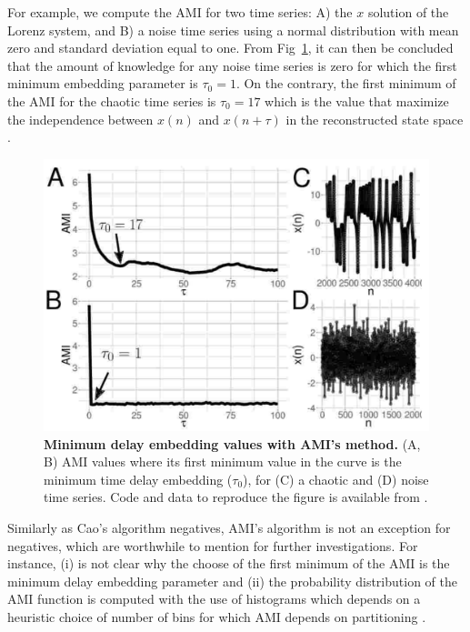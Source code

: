 \documentclass[fleqn,10pt]{wlscirep}
\begin{document}
For example, we compute the AMI for two time series:
A) the $x$ solution of the Lorenz system, and
B) a noise time series using a normal distribution with mean zero and 
standard deviation equal to one. From Fig~\ref{fig:amis}, it can then be 
concluded that the amount of knowledge for any noise time series is zero 
for which the first minimum embedding parameter is $\tau_0=1$. 
On the contrary, the first minimum of the AMI for the chaotic time series 
is $\tau_0=17$ which is the value that maximize the independence 
between $x(n)$ and $x(n+\tau)$ in the reconstructed state space 
\cite{bradley2015}.
\begin{figure}[ht]
\centering
\includegraphics[width=1.0\textwidth]{figures/methods/ami/pdf/ami}
    \caption{
	{\bf Minimum delay embedding values with AMI's method.} 
    	(A, B) AMI values where its first minimum value in the curve
	is the minimum time delay embedding ($\tau_0$), 
	for (C) a chaotic and (D) noise time series.
	Code and data to reproduce the figure is available from \cite{srep2019}.
        }
    \label{fig:amis}
\end{figure}
Similarly as Cao's algorithm negatives, AMI's algorithm is not an
exception for negatives, which are worthwhile to mention for further 
investigations.
For instance, (i) is not clear why the choose of the first minimum of the AMI 
is the minimum delay embedding parameter \cite{kantz2003} and 
(ii) the probability distribution of the AMI function is computed
with the use of histograms which depends on a heuristic choice of number of bins
for which AMI depends on partitioning \cite{garcia2005e71}.
\end{document}

